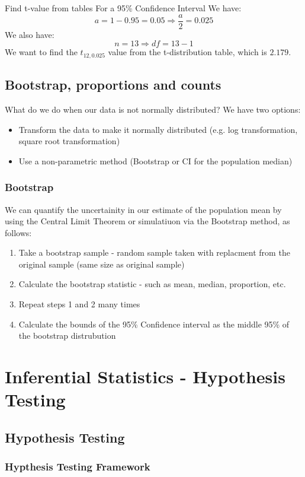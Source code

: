 \documentclass[a4paper, 10pt]{article}
\begin{document}
\begin{examplebox}{Find t-value from tables For a 95\% Confidence Interval}{}
    We have:
    $$a = 1 - 0.95 = 0.05 \Rightarrow \frac{a}{2} = 0.025$$
    We also have:
    $$n = 13 \Rightarrow df = 13 - 1$$
    We want to find the $t_{12, 0.025}$ value from the t-distribution table, which is $2.179$.
\end{examplebox}


\subsection{Bootstrap, proportions and counts}
What do we do when our data is not normally distributed? We have two options:
\begin{itemize}
    \item Transform the data to make it normally distributed (e.g. log transformation, square root transformation)
    \item Use a non-parametric method (Bootstrap or CI for the population median)
\end{itemize}


\subsubsection{Bootstrap}
We can quantify the uncertainity in our estimate of the population mean by using the Central Limit Theorem or simulatiuon via the Bootstrap method, as follows:
\begin{enumerate}
    \item Take a bootstrap  sample - random sample taken with replacment from the original sample (same size as original sample)
    \item Calculate the bootstrap statistic - such as mean, median, proportion, etc.
    \item Repeat steps 1 and 2 many times
    \item Calculate the bounds of the 95\% Confidence interval as the middle 95\% of the bootstrap distrubution
\end{enumerate}


\section{Inferential Statistics - Hypothesis Testing}
\subsection{Hypothesis Testing}
\subsubsection{Hypthesis Testing Framework}
\end{document}
